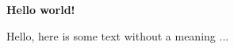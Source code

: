 \documentclass[../root.tex]{subfiles}
\begin{document}
\textbf{Hello world!}

Hello, here is some text without a meaning \cite{knuthwebsite}...
\end{document}
